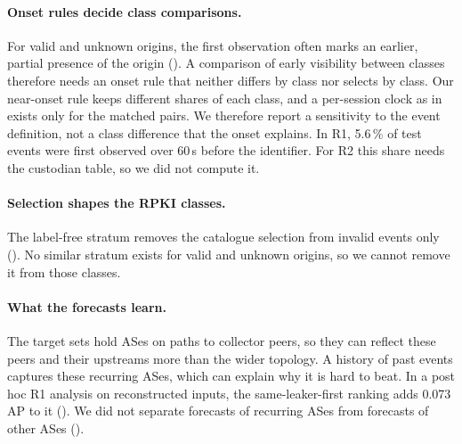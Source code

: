 \paragraph{Onset rules decide class comparisons.}
For valid and unknown origins, the first observation often marks an earlier, partial presence of the origin ().
A comparison of early visibility between classes therefore needs an onset rule that neither differs by class nor selects by class.
Our near-onset rule keeps different shares of each class, and a per-session clock as in  exists only for the matched pairs.
We therefore report a sensitivity to the event definition, not a class difference that the onset explains.
In R1, 5.6\,\% of test events were first observed over 60\,s before the identifier.
For R2 this share needs the custodian table, so we did not compute it.

\paragraph{Selection shapes the RPKI classes.}
The label-free stratum removes the catalogue selection from invalid events only ().
No similar stratum exists for valid and unknown origins, so we cannot remove it from those classes.

\paragraph{What the forecasts learn.}
The target sets hold ASes on paths to collector peers, so they can reflect these peers and their upstreams more than the wider topology.
A history of past events captures these recurring ASes, which can explain why it is hard to beat.
In a post hoc R1 analysis on reconstructed inputs, the same-leaker-first ranking adds 0.073 AP to it ().
We did not separate forecasts of recurring ASes from forecasts of other ASes ().

